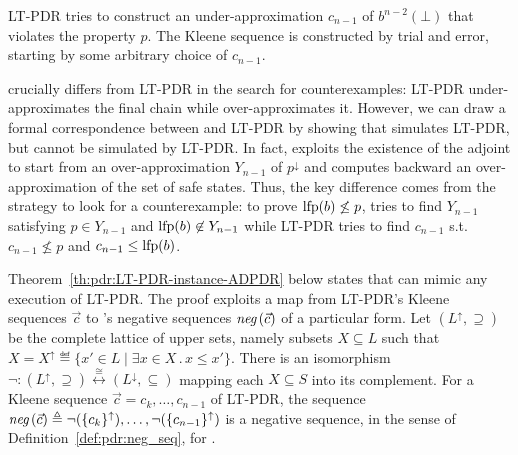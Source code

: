 LT-PDR tries to construct an under-approximation $c_{n-1}$ of $b^{n-2}(\bot)$ that violates the property $p$. The Kleene sequence is constructed by trial and error, starting by some arbitrary choice of $c_{n-1}$.

	{\APDR} crucially differs from LT-PDR in the search for counterexamples: LT-PDR under-approximates the final chain while {\APDR} over\hyp{}approximates it. However, we can draw a formal correspondence between {\ADPDR} and LT-PDR by showing that {\ADPDR} simulates LT-PDR, but cannot be simulated by LT-PDR.
In fact, {\ADPDR} exploits the existence of the adjoint to start from an over\hyp{}approximation $Y_{n-1}$ of $p^\downarrow$ and computes backward an over-approximation of the set of safe states.
Thus, the key difference comes from the strategy to look for a counterexample: to prove $\text{lfp}(b) \not \le p$, {\ADPDR} tries to find $Y_{n-1}$ satisfying $p \in Y_{n-1}$ and $\text{lfp}(b) \not \in Y_{n-1}$ while LT-PDR tries to find $c_{n-1}$ s.t. $c_{n-1} \not \le p$ and $c_{n-1} \le \text{lfp}(b)$.

Theorem~\ref{th:pdr:LT-PDR-instance-ADPDR} below states that {\ADPDR} can mimic any execution of LT-PDR. The proof exploits a map from LT-PDR's Kleene sequences $\vec{c}$ to {\ADPDR}'s negative sequences $\textit{neg}\,(\vec{c})$ of a particular form.
Let $(L^{\uparrow}, \supseteq)$  be the complete lattice of upper sets, namely subsets $X \subseteq L$ such that $X=X^\uparrow \eqdef \{x'\in L \mid \exists x\in X \,. \, x\le x'\}$.
There is an isomorphism $\neg \colon {(L^\uparrow, \supseteq)} \stackrel{\cong}{\longleftrightarrow} (L^\downarrow, \subseteq)$ mapping each $X\subseteq S$ into its complement.
For a Kleene sequence $\vec{c} = c_k,\dots, c_{n-1}$ of LT-PDR, the sequence $\textit{neg}\,(\vec{c}) \triangleq \lnot (\{ c_k \}^{\uparrow}), \dots, \lnot (\{ c_{n-1} \}^{\uparrow})$ is a negative sequence, in the sense of Definition~\ref{def:pdr:neg_seq}, for {\ADPDR}.

